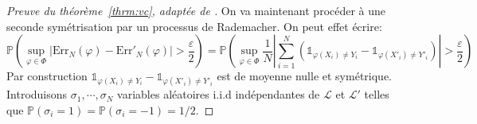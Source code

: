 \begin{proof}[Preuve du théorème~\ref{thrm:vc}, adaptée de \citet{Devroye1997}]
    On va maintenant procéder à une seconde symétrisation par un processus de Rademacher. On peut effet écrire:
    \begin{equation*}
        \mathbb{P} \left( \sup_{\varphi \in \Phi} \left\vert \mathrm{Err}_N (\varphi) - \mathrm{Err}'_N (\varphi) \right\vert > \frac{\varepsilon}{2} \right) = \mathbb{P} \left( \sup_{\varphi \in \Phi} \frac{1}{N} \left\vert \sum_{i=1}^N ( \mathds{1}_{\varphi (X_i) \neq Y_i} - \mathds{1}_{\varphi (X'_i) \neq Y'_i} )  \right\vert > \frac{\varepsilon}{2}\right)
    \end{equation*}
    Par construction $\mathds{1}_{\varphi (X_i) \neq Y_i} - \mathds{1}_{\varphi (X'_i) \neq Y'_i}$ est de moyenne nulle et symétrique. Introduisons $\sigma_1,\cdots,\sigma_N$ variables aléatoires i.i.d indépendantes de $\mathcal{L}$ et $\mathcal{L}'$ telles que $\mathbb{P} (\sigma_i = 1) = \mathbb{P} (\sigma_i = -1) = 1/2$.
    

\end{proof}
